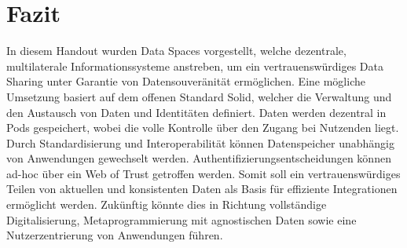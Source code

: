
\section{Fazit}

In diesem Handout wurden Data Spaces vorgestellt, welche dezentrale, multilaterale Informationssysteme anstreben, um ein vertrauenswürdiges Data Sharing unter Garantie von Datensouveränität ermöglichen.
Eine mögliche Umsetzung basiert auf dem offenen Standard Solid, welcher die Verwaltung und den Austausch von Daten und Identitäten definiert.
Daten werden dezentral in Pods gespeichert, wobei die volle Kontrolle über den Zugang bei Nutzenden liegt.
Durch Standardisierung und Interoperabilität können Datenspeicher unabhängig von Anwendungen gewechselt werden.
Authentifizierungsentscheidungen können ad-hoc über ein Web of Trust getroffen werden.
Somit soll ein vertrauenswürdiges Teilen von aktuellen und konsistenten Daten als Basis für effiziente Integrationen ermöglicht werden.
Zukünftig könnte dies in Richtung vollständige Digitalisierung, Metaprogrammierung mit agnostischen Daten sowie eine Nutzerzentrierung von Anwendungen führen.




    
    
    
    
